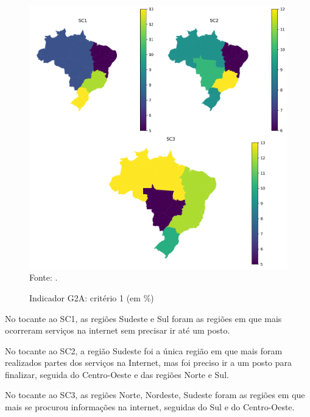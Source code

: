\begin{figure}[H]
	\centering
	\caption{Indicador G2A: critério 1 (em \%)}
	\includegraphics[width=1\linewidth]{figuras/mapa_coropletico_tic_domicilios_2024_g2a_1.png}
	\label{fig:mapa_coropletico_tic_domicilios_2024_g2a_1}
	\footnotesize{Fonte: \cite{tic_domicilios_2024_g2a}.}
\end{figure}

No tocante ao SC1, as regiões Sudeste e Sul foram as regiões em que mais ocorreram serviços na internet sem precisar ir até um posto. 

No tocante ao SC2, a região Sudeste foi a única região em que mais foram realizados partes dos serviços na Internet, mas foi preciso ir a um posto para finalizar, seguida do Centro-Oeste e das regiões Norte e Sul.

No tocante ao SC3, as regiões Norte, Nordeste, Sudeste foram as regiões em que mais se procurou informações na internet, seguidas do Sul e do Centro-Oeste.

